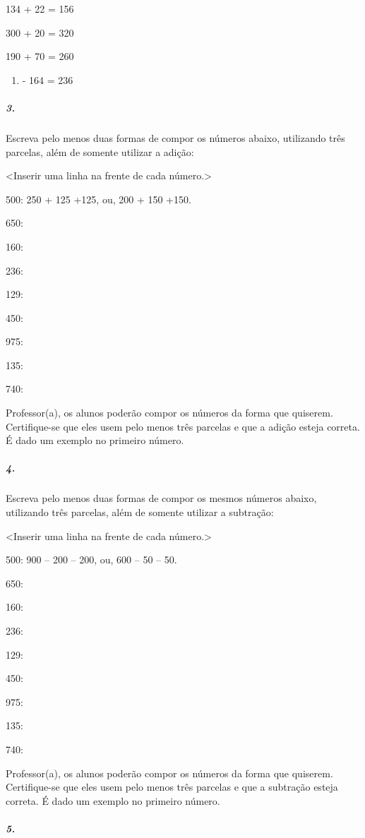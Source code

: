 134 + 22 = 156

300 + 20 = 320

190 + 70 = 260

\begin{enumerate}
\def\labelenumi{\arabic{enumi}.}
\setcounter{enumi}{399}
\item
  - 164 = 236
\end{enumerate}

\subparagraph{3.}\label{section-16}

Escreva pelo menos duas formas de compor os números abaixo, utilizando
três parcelas, além de somente utilizar a adição:

\textless{}Inserir uma linha na frente de cada número.\textgreater{}

500: 250 + 125 +125, ou, 200 + 150 +150.

650:

160:

236:

129:

450:

975:

135:

740:

Professor(a), os alunos poderão compor os números da forma que quiserem.
Certifique-se que eles usem pelo menos três parcelas e que a adição
esteja correta. É dado um exemplo no primeiro número.

\subparagraph{4.}\label{section-17}

Escreva pelo menos duas formas de compor os mesmos números abaixo,
utilizando três parcelas, além de somente utilizar a subtração:

\textless{}Inserir uma linha na frente de cada número.\textgreater{}

500: 900 -- 200 -- 200, ou, 600 -- 50 -- 50.

650:

160:

236:

129:

450:

975:

135:

740:

Professor(a), os alunos poderão compor os números da forma que quiserem.
Certifique-se que eles usem pelo menos três parcelas e que a subtração
esteja correta. É dado um exemplo no primeiro número.

\subparagraph{5.}\label{section-18}

